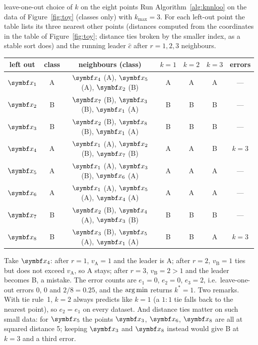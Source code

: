 \documentclass[11pt]{article}
\begin{document}
\begin{worked}{leave-one-out choice of $k$ on the eight points}
Run Algorithm~\ref{alg:knnloo} on the data of Figure~\ref{fig:toy} (classes only) with $k_{\max} = 3$. For each
left-out point the table lists its three nearest other points (distances computed from the coordinates in the table
of Figure~\ref{fig:toy}; distance ties broken by the smaller index, as a stable sort does) and the running leader
$\hat c$ after $r = 1, 2, 3$ neighbours.
\begin{center}\small
\begin{tabular}{@{}ccccccc@{}}
\toprule
left out & class & neighbours (class) & $k = 1$ & $k = 2$ & $k = 3$ & errors \\
\midrule
$\x_1$ & A & $\x_4$ (A), $\x_5$ (A), $\x_2$ (B) & A & A & A & --- \\
$\x_2$ & B & $\x_7$ (B), $\x_3$ (B), $\x_1$ (A) & B & B & B & --- \\
$\x_3$ & B & $\x_2$ (B), $\x_8$ (B), $\x_1$ (A) & B & B & B & --- \\
$\x_4$ & A & $\x_1$ (A), $\x_2$ (B), $\x_7$ (B) & A & A & B & $k = 3$ \\
$\x_5$ & A & $\x_1$ (A), $\x_3$ (B), $\x_6$ (A) & A & A & A & --- \\
$\x_6$ & A & $\x_1$ (A), $\x_5$ (A), $\x_4$ (A) & A & A & A & --- \\
$\x_7$ & B & $\x_2$ (B), $\x_4$ (A), $\x_3$ (B) & B & B & B & --- \\
$\x_8$ & B & $\x_3$ (B), $\x_5$ (A), $\x_1$ (A) & B & B & A & $k = 3$ \\
\bottomrule
\end{tabular}
\end{center}
Take $\x_4$: after $r = 1$, $v_{\mathrm A} = 1$ and the leader is A; after $r = 2$, $v_{\mathrm B} = 1$ ties but does not
exceed $v_{\mathrm A}$, so A stays; after $r = 3$, $v_{\mathrm B} = 2 > 1$ and the leader becomes B, a mistake. The
error counts are $e_1 = 0$, $e_2 = 0$, $e_3 = 2$, i.e.\ leave-one-out errors $0$, $0$ and $2/8 = 0.25$, and the
$\operatorname*{arg\,min}$ returns $k^* = 1$. Two remarks. With tie rule~1, $k = 2$ always predicts like $k = 1$ (a $1:1$ tie falls
back to the nearest point), so $e_2 = e_1$ on every dataset. And distance ties matter on such small data: for $\x_5$
the points $\x_3$, $\x_6$, $\x_8$ are all at squared distance 5; keeping $\x_3$ and $\x_8$ instead would give B at
$k = 3$ and a third error.
\end{worked}
\end{document}

